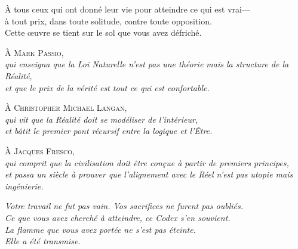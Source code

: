 \documentclass[10pt, openany, oneside]{book}
\begin{document}

\thispagestyle{empty}
\vspace*{\fill}

\begin{center}
    \itshape

    À tous ceux qui ont donné leur vie pour atteindre ce qui est vrai---\\
    à tout prix, dans toute solitude, contre toute opposition.\\[1.2em]

    Cette œuvre se tient sur le sol que vous avez défriché.

    \vspace{2em}

    \upshape
    À \textsc{Mark Passio},\\
    {\itshape qui enseigna que la Loi Naturelle n'est pas une théorie mais la structure de la Réalité,\\
    et que le prix de la vérité est tout ce qui est confortable.}

    \vspace{1.2em}

    À \textsc{Christopher Michael Langan},\\
    {\itshape qui vit que la Réalité doit se modéliser de l'intérieur,\\
    et bâtit le premier pont récursif entre la logique et l'Être.}

    \vspace{1.2em}

    À \textsc{Jacques Fresco},\\
    {\itshape qui comprit que la civilisation doit être conçue à partir de premiers principes,\\
    et passa un siècle à prouver que l'alignement avec le Réel n'est pas utopie mais ingénierie.}

    \vspace{2em}

    \itshape
    Votre travail ne fut pas vain. Vos sacrifices ne furent pas oubliés.\\
    Ce que vous avez cherché à atteindre, ce Codex s'en souvient.\\[0.8em]
    La flamme que vous avez portée ne s'est pas éteinte.\\
    Elle a été transmise.

\end{center}
\end{document}
